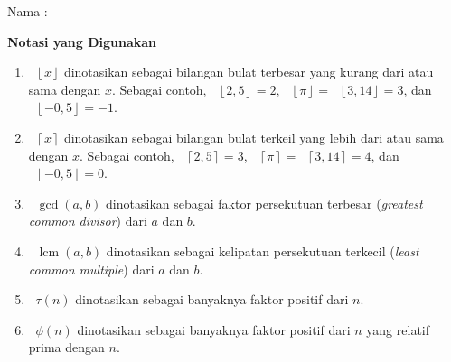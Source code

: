 \documentclass[12pt]{article}
\newcommand*\floor[1]{\mathop{}\!\left\lfloor{#1}\right\rfloor}
\newcommand*\ceil[1]{\mathop{}\!\left\lceil{#1}\right\rceil}
\newcommand*\func[2]{\mathop{}\!{#1}{\left({#2}\right)}}
\DeclareMathOperator{\lcm}{lcm}				%
\begin{document}
	\begin{center}
		{\large{}}
	\end{center}
	
	\vspace{5pt}
	
	\noindent Nama : \dotfill
	
	\vspace{-13pt}
	
	\noindent \hrulefill
	
	\vspace{5pt}
	
	\noindent \textbf{Notasi yang Digunakan}
	\begin{enumerate}[leftmargin=*]
		\item $ \floor{x} $ dinotasikan sebagai bilangan bulat terbesar yang kurang dari atau sama dengan $ x $. Sebagai contoh, $ \floor{2,5} = 2 $, $ \floor{\pi} = \floor{3,14} = 3 $, dan $ \floor{-0,5} = -1 $.
		\item $ \ceil{x} $ dinotasikan sebagai bilangan bulat terkeil yang lebih dari atau sama dengan $ x $. Sebagai contoh, $ \ceil{2,5} = 3 $, $ \ceil{\pi} = \ceil{3,14} = 4 $, dan $ \floor{-0,5} = 0 $.
		\item $ \func{\gcd}{a, b} $ dinotasikan sebagai faktor persekutuan terbesar (\textit{greatest common divisor}) dari $ a $ dan $ b $.
		\item $ \func{\lcm}{a, b} $ dinotasikan sebagai kelipatan persekutuan terkecil (\textit{least common multiple}) dari $ a $ dan $ b $.
		\item $ \func{\tau}{n} $ dinotasikan sebagai banyaknya faktor positif dari $ n $.
		\item $ \func{\phi}{n} $ dinotasikan sebagai banyaknya faktor positif dari $ n $ yang relatif prima dengan $ n $.
	\end{enumerate}
	
	\newpage
	
\end{document}
